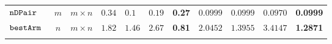 {\begin {table}[t]
\begin{center}
{\begin{tabular}{|| >{\tiny}l || c | c || c | l | c | r || c | l | c | r || }
        $\mathtt{nDPair}$~\cite{Jamieson2015TheAO} & $ m $ & $  m \times n  $   & $0.34$  & $0.1$ & $0.19$ & \textbf{0.27} & $0.0999$   & $0.0999$ & $0.0970$ & \textbf{0.0999}   \\
        \hhline{||-||---||-||--||----||}
        $\mathtt{bestArm}$~\cite{Jamieson2015TheAO} & $ n $ & $  m \times n $  & $1.82$  & $1.46$ & $2.67$ & \textbf{0.81}& $ 2.0452$   & $ 1.3955$ & {{$3.4147$}} & \textbf{1.2871} \\
        \hhline{|:t=========== t:|}
        \multirow{2}{*}{Program $c$}

\end{tabular}}
\end{center}
\end{table}}
